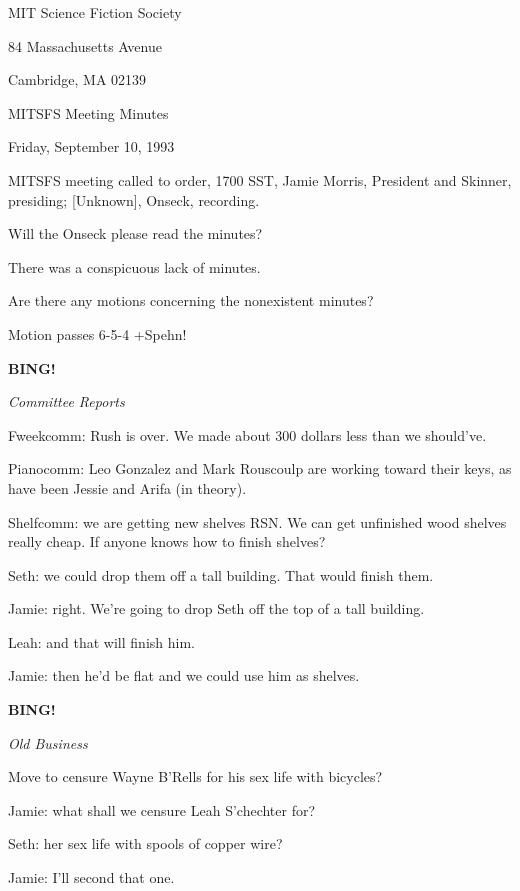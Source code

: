\documentclass[12pt]{article}
\newcommand{\bing}{{\bf BING!} }
\newcommand{\goto}[1]{\bing \vskip 12pt \centerline{{\em{#1}}}}
\begin{document}
\begin{center}

MIT Science Fiction Society 

84 Massachusetts Avenue

Cambridge, MA 02139

\vspace{12pt}

MITSFS Meeting Minutes 

Friday, September 10, 1993

\end{center}
 
\vspace{18pt}

\setlength{\parskip}{6pt}

\noindent
MITSFS meeting called to order, 1700 SST,
Jamie Morris, President and Skinner, presiding; [Unknown], Onseck, recording.

Will the Onseck please read the minutes?

There was a conspicuous lack of minutes.

Are there any motions concerning the nonexistent minutes?

Motion passes 6-5-4 +Spehn!

\goto{Committee Reports}

Fweekcomm: Rush is over. We made about 300 dollars less than we should've.

Pianocomm: Leo Gonzalez and Mark Rouscoulp are working toward their keys, as have been Jessie and Arifa (in theory).

Shelfcomm: we are getting new shelves RSN. We can get unfinished wood shelves really cheap. If anyone knows how to finish shelves?

Seth: we could drop them off a tall building. That would finish them.

Jamie: right. We're going to drop Seth off the top of a tall building.

Leah: and that will finish him.

Jamie: then he'd be flat and we could use him as shelves.

\goto{Old Business}

Move to censure Wayne B'Rells for his sex life with bicycles?

Jamie: what shall we censure Leah S'chechter for?

Seth: her sex life with spools of copper wire?

Jamie: I'll second that one.
\end{document}
